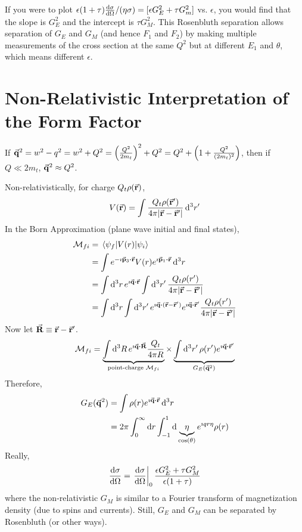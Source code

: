 \documentclass[a4paper,twoside,master.tex]{subfiles}
\begin{document}

If you were to plot $ \epsilon(1+ \tau) \dv{\sigma}{\Omega} / (\eta \sigma) = [\epsilon G_E^2 + \tau G_m^2] $ vs. $ \epsilon $, you would find that the slope is $ G_E^2 $ and the intercept is $ \tau G_M^2 $. This Rosenbluth separation allows separation of $ G_E $ and $ G_M $ (and hence $ F_1 $ and $ F_2 $) by making multiple measurements of the cross section at the same $ Q^2 $ but at different $ E_1 $ and $ \theta $, which means different $ \epsilon $. 

\section{Non-Relativistic Interpretation of the Form Factor}\label{sec:non-relativistic_interpretation_of_the_form_factor}

If $ \va{q}^2 = w^2 - q^2 = w^2 + Q^2 = \left( \frac{Q^2}{2m_t} \right)^2 + Q^2 = Q^2 + \left( 1 + \frac{Q^2}{(2 m_t)^2} \right) $, then if $ Q \ll 2m_t $, $ \va{q}^2 \approx Q^2 $.

Non-relativistically, for charge $ Q_t \rho(\va{r}) $,
\begin{equation}
    V(\va{r}) = \int \frac{Q_t \rho(\va{r}')}{4 \pi \abs{\va{r} - \va{r}'}} \dd[3]{r'}
\end{equation}
In the Born Approximation (plane wave initial and final states),
\begin{align}
    \mathcal{M}_{fi} &= \mel{\psi_f}{V(r)}{\psi_i} \\
                     &= \int e^{- \imath \va{p}_3 \vdot \va{r}} V(r) e^{\imath \va{p}_1 \vdot \va{r}} \dd[3]{r} \\
                     &= \int \dd[3]{r}e^{\imath \va{q} \vdot \va{r}} \int \dd[3]{r'} \frac{Q_t \rho(r')}{4 \pi \abs{\va{r} - \va{r}'}} \\
                     &= \int \dd[3]{r} \int \dd[3]{r'} e^{\imath \va{q} \vdot (\va{r} - \va{r}')} e^{\imath \va{q} \vdot \va{r}'} \frac{Q_t \rho(r')}{4 \pi \abs{\va{r} - \va{r}'}}
\end{align}
Now let $ \va{R} \equiv \va{r} - \va{r}' $.
\begin{equation}
    \mathcal{M}_{fi} = \underbrace{\int \dd[3]{R}e^{\imath \va{q} \vdot \va{R}} \frac{Q_t}{4 \pi R}}_{\text{point-charge } \mathcal{M}_{fi}} \times \underbrace{\int \dd[3]{r'} \rho(r') e^{\imath \va{q} \vdot \va{r}'}}_{G_E(\va{q}^2)}
\end{equation}
Therefore,
\begin{align}
    G_E(\va{q}^2) &= \int \rho(r) e^{\imath \va{q} \vdot \va{r}} \dd[3]{r} \\
                  &= 2 \pi \int_0^{\infty} \dd{r} \int_{-1}^{1} \dd{\underbrace{\eta}_{\cos(\theta)}} e^{\imath q r \eta} \rho(r)
\end{align}
Really,
\begin{equation}
    \dv{\sigma}{\Omega}= \eval{\dv{\sigma}{\Omega}}_{0} \frac{\epsilon G_E^2 + \tau G_M^2}{\epsilon(1 + \tau)}
\end{equation}
where the non-relativistic $ G_M $ is similar to a Fourier transform of magnetization density (due to spins and currents). Still, $ G_E $ and $ G_M $ can be separated by Rosenbluth (or other ways).
\end{document}
